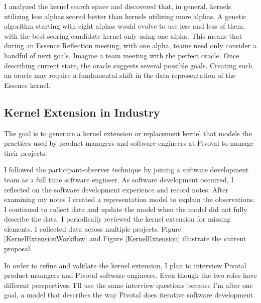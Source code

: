 \documentclass[preprint,12pt,3p]{elsarticle}
\begin{document}
I analyzed the kernel search space and discovered that, in general, kernels utilizing less alphas scored better than kernels utilizing more alphas. A genetic algorithm starting with eight alphas would evolve to use less and less of them, with the best scoring candidate kernel only using one alpha. This means that during an Essence Reflection meeting, with one alpha, teams need only consider a handful of next goals. Imagine a team meeting with the perfect oracle. Once describing current state, the oracle suggests several possible goals. Creating such an oracle may require a fundamental shift in the data representation of the Essence kernel. 


\subsection{Kernel Extension in Industry}
\label{PivotalKernelExtension}

The goal is to generate a kernel extension or replacement kernel that models the practices used by product managers and software engineers at Pivotal to manage their projects.

I followed the participant-observer technique by joining a software development team as a full time software engineer. As software development occurred, I reflected on the software development experience and record notes. After examining my notes I created a representation model to explain the observations. I continued to collect data and update the model when the model did not fully describe the data. I periodically reviewed the kernel extension for missing elements. I collected data across multiple projects. Figure \ref{KernelExtensionWorkflow} and Figure \ref{KernelExtension} illustrate the current proposal.

In order to refine and validate the kernel extension, I plan to interview Pivotal product managers and Pivotal software engineers. Even though the two roles have different perspectives, I'll use the same interview questions because I'm after one goal, a model that describes the way Pivotal does iterative software development.
\end{document}
